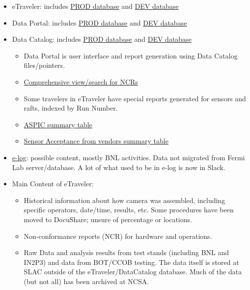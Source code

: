 	\begin{itemize}
		\item eTraveler: includes \href{https://lsst-camera.slac.stanford.edu/eTraveler/exp/LSST-CAMERA/welcome.jsp?dataSourceMode=Prod}{PROD database} and \href{https://lsst-camera.slac.stanford.edu/eTraveler/exp/LSST-CAMERA/welcome.jsp?dataSourceMode=Dev}{DEV database}
		\item Data Portal: includes \href{https://lsst-camera.slac.stanford.edu/DataPortal/index.jsp?dataSourceMode=Prod}{PROD database} and \href{https://lsst-camera.slac.stanford.edu/DataPortal/index.jsp?dataSourceMode=Dev}{DEV database}
		\item Data Catalog: includes \href{https://srs.slac.stanford.edu/DataCatalog/index.jsp?dataSourceMode=Prod}{PROD database} and \href{https://srs.slac.stanford.edu/DataCatalog/index.jsp?dataSourceMode=Dev}{DEV database}
		\begin{itemize}
			\item Data Portal is user interface and report generation using Data Catalog files/pointers.
			\item \href{https://lsst-camera.slac.stanford.edu/DataPortal/ncrStatus-compact.jsp}{Comprehensive view/search for NCRs}
			\item Some travelers in eTraveler have special reports generated for sensors and rafts, indexed by Run Number.
			\item \href{https://lsst-camera.slac.stanford.edu/DataPortal/aspicStatus.jsp}{ASPIC summary table}
			\item \href{https://lsst-camera.slac.stanford.edu/DataPortal/SensorAcceptance.jsp}{Sensor Acceptance from vendors summary table}
		\end{itemize}
		\item \href{http://dbweb0.fnal.gov/ECL/lsst_camera}{e-log}: possible content, mostly BNL activities. Data not migrated from Fermi Lab server/database. A lot of what used to be in e-log is now in Slack.
		\item Main Content of eTraveler:
		\begin{itemize}
			\item Historical information about how camera was assembled, including specific operators, date/time, results, etc. Some procedures have been moved to DocuShare; unsure of percentage or locations.
			\item Non-conformance reports (NCR) for hardware and operations.
			\item Raw Data and analysis results from test stands (including BNL and IN2P3) and data from BOT/CCOB testing. The data itself is stored at SLAC outside of the eTraveler/DataCatalog database. Much of the data (but not all) has been archived at NCSA.

\end{itemize}
\end{itemize}
